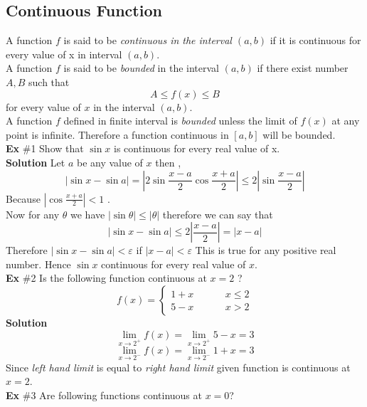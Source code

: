 \documentclass[10pt,a4paper]{article}
\begin{document}
\subsection{Continuous Function} A function $f$ is said to be \emph{ continuous in the interval $(a,b)$} if it is continuous for every value of x in interval $(a,b)$. \\ A function $f$ is said to be \emph{bounded} in the interval $(a,b)$ if there exist number $A,B$ such that $$A\leq f(x) \leq B$$  for every value of $x$ in the interval $(a,b)$.\\ A function $f$ defined in finite interval is \emph{bounded} unless the limit of $f(x)$ at any point is infinite. Therefore a function continuous in $[a,b]$ will be bounded.
\\
\textbf{Ex }\#1 Show that $\sin x$ is continuous for every real value of x. \\
\textbf{Solution } Let $a$ be any value of $x$ then , 
\begin{equation*}
|\sin x -\sin a|=|2\sin\frac{x-a}{2}\cos\frac{x+a}{2}|\leq2|\sin\frac{x-a}{2}| 
\end{equation*}
Because $|\cos\frac{x+a}{2}|<1$ . \\ Now for any $\theta$ we have $|\sin\theta|\leq |\theta|$ therefore we can say that 
$$|\sin x- \sin a|\leq 2|\frac{x-a}{2}|=|x-a|$$
Therefore $|\sin x -\sin a| < \varepsilon$ if $|x-a|<\varepsilon$ This is true for any positive real number. Hence $\sin x$ continuous for every real value of $x$. \\
\textbf{Ex }\#2 Is  the following function continuous at $x=2$ ? 
\begin{equation*}
f(x)= \begin{cases}
1+x & \hspace{1cm}  x\leq 2\\
5-x& \hspace{1cm}  x>2
\end{cases}
\end{equation*}
\textbf{Solution } $$\lim_{x \to 2^+}f(x)= \lim_{x \to 2^+}5-x=3$$ 
$$\lim_{x \to 2^-}f(x)=\lim_{x \to 2^-}1+x=3$$
Since \emph{left hand limit} is equal to \emph{right hand limit} given function is continuous at $x=2$. \\
\textbf{Ex }\#3 Are following functions continuous at $x=0$? 
\end{document}
